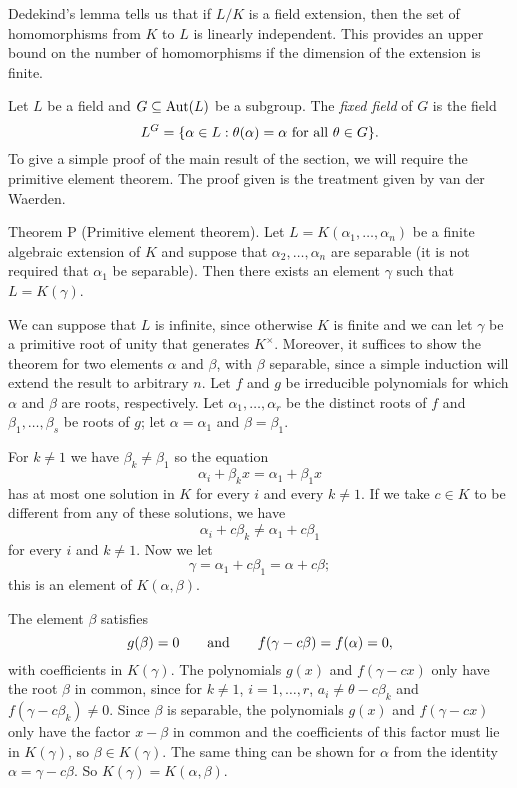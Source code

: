 Dedekind's lemma tells us that if $L/K$ is a field extension, then the set of homomorphisms from $K$ to $L$ is linearly independent. This provides an upper bound on the number of homomorphisms if the dimension of the extension is finite.

Let $L$ be a field and $G\subseteq \mathop {\rm Aut}(L)$ be a subgroup. The {\it fixed field} of $G$ is the field
$$L^G = \{\alpha\in L : \theta(\alpha) = \alpha\ \hbox{for all}\ \theta\in G\}.$$
To give a simple proof of the main result of the section, we will require the primitive element theorem. The proof given is the treatment given by van der Waerden.

\parenproclaim Theorem P (Primitive element theorem). Let $L = K(\alpha_1,\ldots,\alpha_n)$ be a finite algebraic extension of $K$ and suppose that $\alpha_2,\ldots,\alpha_n$ are separable (it is not required that $\alpha_1$ be separable). Then there exists an element $\gamma$ such that $L = K(\gamma)$.

\proof We can suppose that $L$ is infinite, since otherwise $K$ is finite and we can let $\gamma$ be a primitive root of unity that generates $K^\times$. Moreover, it suffices to show the theorem for two elements $\alpha$ and $\beta$, with $\beta$ separable, since a simple induction will extend the result to arbitrary $n$. Let $f$ and $g$ be irreducible polynomials for which $\alpha$ and $\beta$ are roots, respectively. Let $\alpha_1,\ldots,\alpha_r$ be the distinct roots of $f$ and $\beta_1,\ldots,\beta_s$ be roots of $g$; let $\alpha =\alpha_1$ and $\beta = \beta_1$.

For $k\neq 1$ we have $\beta_k\neq \beta_1$ so the equation
$$\alpha_i + \beta_k x = \alpha_1 + \beta_1x$$
has at most one solution in $K$ for every $i$ and every $k\neq 1$. If we take $c\in K$ to be different from any of these solutions, we have
$$\alpha_i + c\beta_k \neq \alpha_1 + c\beta_1$$
for every $i$ and $k\neq 1$. Now we let
$$\gamma = \alpha_1 + c\beta_1 = \alpha + c\beta;$$
this is an element of $K(\alpha,\beta)$.

The element $\beta$ satisfies
$$g(\beta) = 0\qquad\hbox{and}\qquad f(\gamma - c\beta) = f(\alpha) = 0,$$
with coefficients in $K(\gamma)$. The polynomials $g(x)$ and $f(\gamma - cx)$ only have the root $\beta$ in common, since for $k\neq 1$, $i = 1,\ldots,r$, $a_i \neq \theta - c\beta_k$ and $f(\gamma - c\beta_k) \neq 0$. Since $\beta$ is separable, the polynomials $g(x)$ and $f(\gamma - cx)$ only have the factor $x-\beta$ in common and the coefficients of this factor must lie in $K(\gamma)$, so $\beta\in K(\gamma)$. The same thing can be shown for $\alpha$ from the identity $\alpha = \gamma - c\beta$. So $K(\gamma) = K(\alpha,\beta)$.\slug

